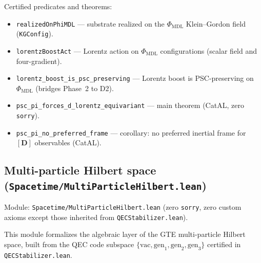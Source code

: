 \documentclass[11pt,a4paper]{article}
\theoremstyle{definition}
\begin{document}
Certified predicates and theorems:
\begin{itemize}[nosep]
\item \lstinline|realizedOnPhiMDL| --- substrate realized on the
  $\Phi_{\mathrm{MDL}}$ Klein--Gordon field (\lstinline|KGConfig|).
\item \lstinline|lorentzBoostAct| --- Lorentz action on $\Phi_{\mathrm{MDL}}$
  configurations (scalar field and four-gradient).
\item \lstinline|lorentz_boost_is_psc_preserving| --- Lorentz boost is
  PSC-preserving on $\Phi_{\mathrm{MDL}}$ (bridges Phase~2 to D2).
\item \lstinline|psc_pi_forces_d_lorentz_equivariant| --- main theorem
  (CatAL, zero \lstinline|sorry|).
\item \lstinline|psc_pi_no_preferred_frame| --- corollary: no preferred
  inertial frame for $[\mathbf{D}]$ observables (CatAL).
\end{itemize}

\subsection{Multi-particle Hilbert space
  (\texttt{Spacetime/MultiParticleHilbert.lean})}\label{subsec:multiparticle-hilbert}

Module: \texttt{Spacetime/MultiParticleHilbert.lean} (zero
\lstinline|sorry|, zero custom axioms except those inherited from
\lstinline|QECStabilizer.lean|).

This module formalizes the algebraic layer of the GTE multi-particle
Hilbert space, built from the QEC code subspace
$\{\mathrm{vac}, \mathrm{gen}_1, \mathrm{gen}_2, \mathrm{gen}_3\}$ certified
in \texttt{QECStabilizer.lean}.
\end{document}
